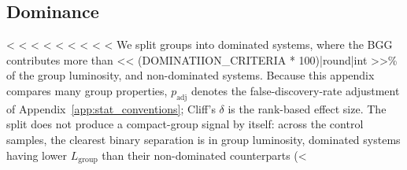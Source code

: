 \documentclass{aa}
\begin{document}
\begin{appendix}
\subsection{Dominance}\label{app:dominance}
<%
<%
<%
<%
<%
<%
<%
<%
<%
We split groups into dominated systems, where the BGG contributes more than << (DOMINATIION_CRITERIA * 100)|round|int >>\% of the group luminosity, and non-dominated systems. Because this appendix compares many group properties, \(p_\mathrm{adj}\) denotes the false-discovery-rate adjustment of Appendix~\ref{app:stat_conventions}; Cliff's \(\delta\) is the rank-based effect size. The split does not produce a compact-group signal by itself: across the control samples, the clearest binary separation is in group luminosity, dominated systems having lower \(L_\mathrm{group}\) than their non-dominated counterparts (<%

\end{appendix}
\end{document}

